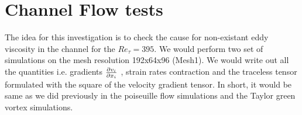 \newpage
\section*{Channel Flow tests}

The idea for this investigation is to check the cause for non-existant eddy viscosity in the channel for the ${Re_{\tau}} = 395$.
We would perform two set of simulations on the mesh resolution 192x64x96 (Mesh1). We would write out all the quantities i.e. gradients $\frac{\partial v_i}{\partial x_i}$ , strain rates contraction and the traceless tensor formulated with the square of the velocity gradient tensor. In short, it would be same as we did previously in the poiseuille flow simulations and the Taylor green vortex simulations. \\

%
%
